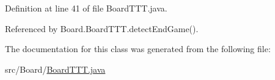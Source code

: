 Definition at line 41 of file Board\+T\+T\+T.\+java.



Referenced by Board.\+Board\+T\+T\+T.\+detect\+End\+Game().



The documentation for this class was generated from the following file\+:\begin{DoxyCompactItemize}
\item 
src/\+Board/\hyperlink{_board_t_t_t_8java}{Board\+T\+T\+T.\+java}\end{DoxyCompactItemize}
